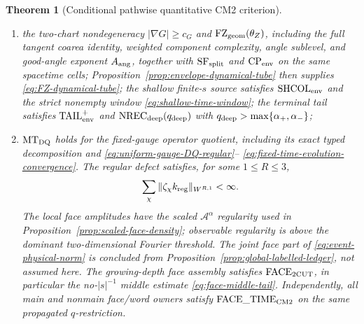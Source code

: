 \documentclass[11pt]{article}
\newtheorem{theorem}{Theorem}[section]
\begin{document}
\begin{theorem}[Conditional pathwise quantitative CM2 criterion]
\begin{enumerate}[label=\textup{(H\arabic*)}]
      same-carrier clause of Lemma~\ref{lem:joint-source-factor-criterion} or
      by its explicit $\mathrm{CARRIER\_MATCH}$ alternative.
      Here \(\mathrm{KRH}_{p_W}\) is uniform on every frozen parent kernel.
      These interfaces and the dominant chart bounds
      \eqref{eq:primitive-dominant-chart-bounds} have the
      parameter-uniform constants required by $\mathrm{UCR}_{\rm sh}$ for
      $C_{\rm mid}(\eta_{\rm hi})N\le L(s)$.  The cutoffs
      \eqref{eq:three-frequency-cutoffs} satisfy
      $0<\eta_{\rm lo}<\eta_{\rm hi}$ and
      $r_{\rm obs}>2+\beta_{\rm phase}^{W}$,
      \eqref{eq:ultra-high-exponent-window}, and the complete phase exponent
      \eqref{eq:complete-phase-exponent}; longer shallow times are not estimated
      by this interface;
\item the two-chart nondegeneracy $|\nabla G|\ge c_G$ and
      $\mathrm{FZ}_{\rm geom}(\theta_Z)$, including the full tangent coarea identity,
      weighted component complexity, angle sublevel, and good-angle exponent
      $A_{\rm ang}$, together with $\mathrm{SF}_{\rm split}$ and
      $\mathrm{CP}_{\rm env}$ on the same spacetime cells;
      Proposition~\ref{prop:envelope-dynamical-tube}
      then supplies \eqref{eq:FZ-dynamical-tube}; the shallow finite-$s$
      source satisfies $\mathrm{SHCOL}_{\rm env}$ and the strict nonempty
      window \eqref{eq:shallow-time-window}; the terminal tail satisfies
      $\mathrm{TAIL}_{\rm env}^{+}$ and
      $\mathrm{NREC}_{\rm deep}(q_{\rm deep})$ with
      $q_{\rm deep}>\max\{\alpha_+,\alpha_-\}$;
\item $\mathrm{MT}_{\rm DQ}$ holds for the fixed-gauge operator quotient,
      including its exact typed decomposition and
      \eqref{eq:uniform-gauge-DQ-regular}--
      \eqref{eq:fixed-time-evolution-convergence}.  The regular defect
      satisfies, for some
      $1\le R\le3$,
      \[
       \sum_\chi\|\zeta_\chi k_{\rm reg}\|_{W^{R,1}}<\infty.
      \]
      The local face amplitudes have the scaled
      $\mathcal A^\alpha$ regularity used in
      Proposition~\ref{prop:scaled-face-density}; observable regularity is
      above the dominant two-dimensional Fourier threshold.  The joint face
      part of \eqref{eq:event-physical-norm} is concluded from
      Proposition~\ref{prop:global-labelled-ledger}, not assumed here.
      The growing-depth face assembly satisfies
      $\mathrm{FACE}_{\rm 2CUT}$, in particular the no-$|s|^{-1}$ middle
      estimate \eqref{eq:face-middle-tail}.  Independently, all main and
      nonmain face/word owners satisfy
      $\mathrm{FACE\_TIME}_{\rm CM2}$ on the same propagated $q$-restriction.

\end{enumerate}
\end{theorem}
\end{document}
